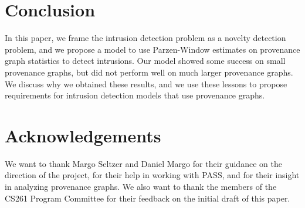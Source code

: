 \documentclass[10pt,twocolumn]{article}
\begin{document}
\section{Conclusion}

In this paper, we frame the intrusion detection problem as a novelty detection problem, and we propose a model to use Parzen-Window estimates on provenance graph statistics to detect intrusions. Our model showed some success on small provenance graphs, but did not perform well on much larger provenance graphs. We discuss why we obtained these results, and we use these lessons to propose requirements for intrusion detection models that use provenance graphs.

%

\section{Acknowledgements}
We want to thank Margo Seltzer and Daniel Margo for their guidance on the direction of the project, for
their help in working with PASS, and for their insight in analyzing provenance graphs. We also want to thank the members of the
CS261 Program Committee for their feedback on the initial draft of this paper.


%
\end{document}
